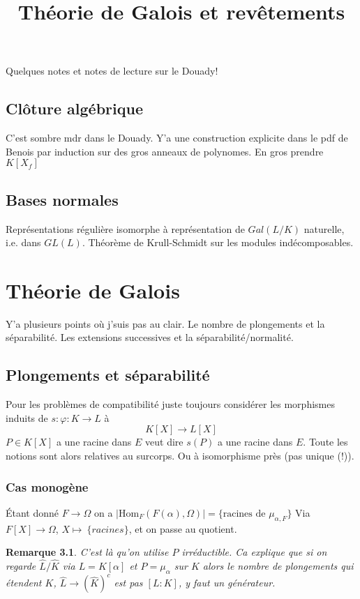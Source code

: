 \documentclass[a4paper,12pt]{book}
\title{Théorie de Galois et revêtements}
\date{}
\newcommand{\Hom}{\textrm{Hom}}
\theoremstyle{plain}
\newtheorem{rem}{Remarque}
\theoremstyle{definition}
\theoremstyle{remark}
\begin{document}
\maketitle
\tableofcontents
Quelques notes et notes de lecture sur le Douady!

\section{Clôture algébrique}
C'est sombre mdr dans le Douady. Y'a une construction explicite
dans le pdf de Benois par induction sur des gros anneaux de 
polynomes. En gros prendre $K[X_f]$


\section{Bases normales}
Représentations régulière isomorphe à
représentation de $Gal(L/K)$ naturelle,
i.e. dans $GL(L)$. Théorème de Krull-Schmidt
sur les modules indécomposables.

\chapter{Théorie de Galois}
Y'a plusieurs points où j'suis pas au clair. Le
nombre de plongements et la séparabilité. Les
extensions successives et la séparabilité/normalité.

\section{Plongements et séparabilité}
Pour les problèmes de compatibilité juste toujours considérer les
morphismes induits de $s\colon \varphi\colon K\to L$ à
\[K[X]\to L[X]\]
$P\in K[X]$ a une racine dans $E$ veut dire $s(P)$ a une racine
dans $E$. Toute les notions sont alors relatives au surcorps.
Ou à isomorphisme près (pas unique (!)).
\subsection{Cas monogène}
Étant donné $F\to \Omega$ on a 
$|\Hom_F(F(\alpha),\Omega)|=\{\textrm{racines de }\mu_{\alpha,F}\}$
Via $F[X]\to \Omega$, $X\mapsto~\{racines\}$, et on passe au 
quotient.

\begin{rem}
  C'est là qu'on utilise $P$ irréductible. Ca explique que
  si on regarde $\hat L/\hat K$ via $L=K[\alpha]$ et $P=\mu_\alpha$
  sur $K$ alors le nombre de plongements qui étendent $K$,
  $\hat L\to (\hat K)^c$ est pas $[L:K]$, y faut un générateur.
\end{rem}
\end{document}
